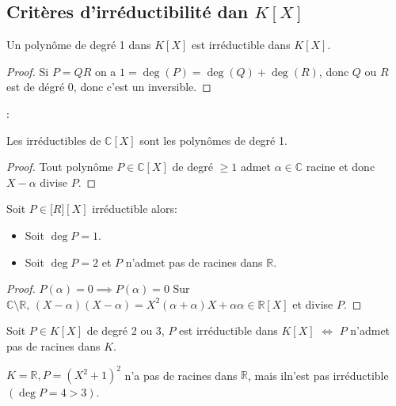 \subsection{Critères d'irréductibilité dan $K[X]$}


\begin{prop}
	Un polynôme de degré 1 dans $K[X]$ est irréductible dans $K[X]$.
\end{prop}

\begin{proof}
	Si $P = QR$ on a $ 1 = \deg(P) = \deg(Q) + \deg(R)$, donc $Q$ ou $R$ est de dégré 0, donc c'est un inversible.
\end{proof}:


\begin{theorem}
	Les irréductibles de $\mathbb{C}[X]$ sont les polynômes de degré 1.
\end{theorem}


\begin{proof}
	Tout polynôme $P\in \mathbb{C}[X]$ de degré $\geq 1$ admet $\alpha \in \mathbb{C}$ racine et donc $X-\alpha$ divise $P$.
\end{proof}



\begin{prop}
	Soit $P \in \mathbb[R][X]$ irréductible alors:
	\begin{itemize}
		\item Soit $\deg P = 1$.
		\item Soit $\deg P = 2$ et $P$ n'admet pas de racines dans $\mathbb{R}$.
	\end{itemize}
\end{prop}


\begin{proof}
	$P(\alpha) = 0 \implies P(\alpha) = 0$ %
	Sur $\mathbb{C} \setminus \mathbb{R}, \, (X- \alpha) (X- \alpha) = X ^2(\alpha + \alpha)X + \alpha\alpha \in \mathbb{R}[X]$ %
	et divise $P$.
\end{proof}



\begin{prop}
	Soit $P \in K[X]$ de degré 2 ou 3,
	$P$ est irréductible dans $K[X]$ $\iff$ $P$ n'admet pas de racines dans $K$.
\end{prop}


\begin{exemple}
	$K = \mathbb{R}, P = (X^2 + 1 )^2$ n'a pas de racines dans $\mathbb{R}$, mais iln'est pas irréductible $(\deg P = 4 > 3)$.
\end{exemple}


